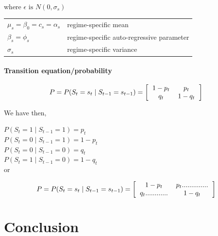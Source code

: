 \documentclass[12pt,a4paper,oneside]{book}
\begin{document}
where $\epsilon \text{ is } N(0,\sigma_s)$


\begin{tabular}{l l}
    $\mu_{s} = \beta_0 = c_s = \alpha_s $    & regime-specific mean    \\
    $\beta_{s} = \phi_s$ & regime-specific  auto-regressive parameter \\
    $\sigma_{s}$ & regime-specific variance    \\

\end{tabular}

\subsubsection{Transition equation/probability}

\begin{equation}
    P = P(S_t = s_t \mid S_{t-1} = s_{t-1}) = 
\left[ \begin{tabular}{c c}
            $1 - p_{t}$	& $p_{t}$ \\ 
            $q_{t}$	& $1 - q_{t}$ \\ 
\end{tabular} \right]
\end{equation}

We have then,

$P(S_t = 1 \mid S_{t-1} = 1) = p_t$   \\ 
$P(S_t = 0 \mid S_{t-1} = 1) = 1 - p_t$ \\
$P(S_t = 0 \mid S_{t-1} = 0) = q_t$   \\
$P(S_t = 1 \mid S_{t-1} = 0) = 1- q_t$ \\

or 

\begin{equation}
    P = P(S_t = s_t \mid S_{t-1} = s_{t-1}) = 
\left[ \begin{tabular}{c c}
            $1 - p_{t}$	& $p_{t} ..............$ \\ 
            $q_{t} ............$	& $1 - q_{t}$ \\ 
\end{tabular} \right]
\end{equation}






\chapter{Conclusion}
\end{document}
